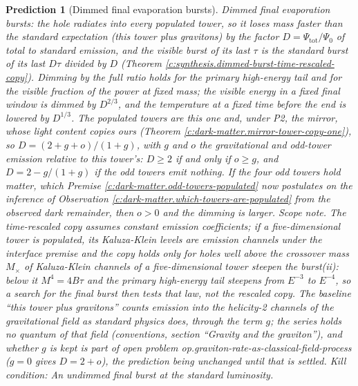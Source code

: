\documentclass[11pt]{article}
\newtheorem{prediction}[theorem]{Prediction}
\theoremstyle{definition}
\theoremstyle{plain}
\begin{document}
\begin{prediction}[Dimmed final evaporation bursts]\label{c:pred.dimmed-evaporation-bursts}
Dimmed final evaporation bursts: the hole radiates into every populated tower, so it loses mass faster than the standard expectation (this tower plus gravitons) by the factor $D = \Psi_{\mathrm{tot}}/\Psi_{0}$ of total to standard emission, and the visible burst of its last $\tau$ is the standard burst of its last $D\tau$ divided by $D$ (Theorem \ref{c:synthesis.dimmed-burst-time-rescaled-copy}). Dimming by the full ratio holds for the primary high-energy tail and for the visible fraction of the power at fixed mass; the visible energy in a fixed final window is dimmed by $D^{2/3}$, and the temperature at a fixed time before the end is lowered by $D^{1/3}$. The populated towers are this one and, under P2, the mirror, whose light content copies ours (Theorem \ref{c:dark-matter.mirror-tower-copy-one}), so $D = (2 + g + o)/(1 + g)$, with $g$ and $o$ the gravitational and odd-tower emission relative to this tower's: $D \ge 2$ if and only if $o \ge g$, and $D = 2 - g/(1 + g)$ if the odd towers emit nothing. If the four odd towers hold matter, which Premise \ref{c:dark-matter.odd-towers-populated} now postulates on the inference of Observation \ref{c:dark-matter.which-towers-are-populated} from the observed dark remainder, then $o > 0$ and the dimming is larger. \emph{Scope note.} The time-rescaled copy assumes constant emission coefficients; if a five-dimensional tower is populated, its Kaluza-Klein levels are emission channels under the interface premise and the copy holds only for holes well above the crossover mass $M_{\times}$ of \emph{Kaluza-Klein channels of a five-dimensional tower steepen the burst}(ii): below it $M^{4} = 4B\tau$ and the primary high-energy tail steepens from $E^{-3}$ to $E^{-4}$, so a search for the final burst then tests that law, not the rescaled copy. The baseline ``this tower plus gravitons'' counts emission into the helicity-2 channels of the gravitational field as standard physics does, through the term $g$; the series holds no quantum of that field (conventions, section ``Gravity and the graviton''), and whether $g$ is kept is part of open problem op.graviton-rate-as-classical-field-process ($g = 0$ gives $D = 2 + o$), the prediction being unchanged until that is settled.
\emph{Kill condition:} An undimmed final burst at the standard luminosity.
\end{prediction}
\end{document}
